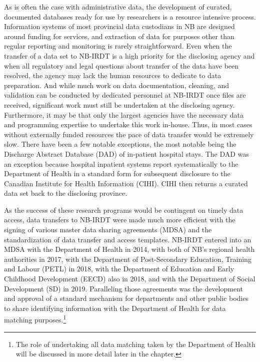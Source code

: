 As is often the case with administrative data, the development of curated, documented databases ready for use by researchers is a resource intensive process. Information systems of most provincial data custodians in NB are designed around funding for services, and extraction of data for purposes other than regular reporting and monitoring is rarely straightforward. Even when the transfer of a data set to NB-IRDT is a high priority for the disclosing agency and when all regulatory and legal questions about transfer of the data have been resolved, the agency may lack the human resources to dedicate to data preparation. And while much work on data documentation, cleaning, and validation can be conducted by dedicated personnel at NB-IRDT once files are received, significant work must still be undertaken at the disclosing agency. Furthermore, it may be that only the largest agencies have the necessary data and programming expertise to undertake this work in-house. Thus, in most cases without externally funded resources the pace of data transfer would be extremely slow. There have been a few notable exceptions, the most notable being the Discharge Abstract Database (DAD) of in-patient hospital stays. The DAD was an exception because hospital inpatient systems report systematically to the Department of Health in a standard form for subsequent disclosure to the Canadian Institute for Health Information (CIHI). CIHI then returns a curated data set back to the disclosing province.

As the success of these research programs would be contingent on timely data access, data transfers to NB-IRDT were made much more efficient with the signing of various master data sharing agreements (MDSA) and the standardization of data transfer and access templates. NB-IRDT entered into an MDSA with the Department of Health in 2014, with both of NB's regional health authorities in 2017, with the Department of Post-Secondary Education, Training and Labour (PETL) in 2018, with the Department of Education and Early Childhood Development (EECD) also in 2018, and with the Department of Social Development (SD) in 2019. Paralleling those agreements was the development and approval of a standard mechanism for departments and other public bodies to share identifying information with the Department of Health for data matching purposes.\footnote{The role of undertaking all data matching taken by the Department of Health will be discussed in more detail later in the chapter.}

